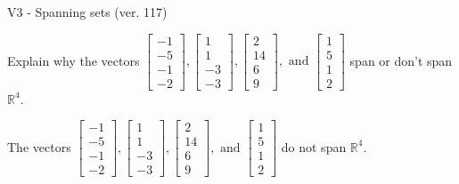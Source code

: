 \begin{exercise}
  \begin{exerciseTitle}V3 - Spanning sets (ver. 117)\end{exerciseTitle}
  \begin{exerciseStatement}
    Explain why the vectors \(\left[\begin{array}{r}
-1 \\
-5 \\
-1 \\
-2
\end{array}\right] , \left[\begin{array}{r}
1 \\
1 \\
-3 \\
-3
\end{array}\right] , \left[\begin{array}{r}
2 \\
14 \\
6 \\
9
\end{array}\right] , \text{ and } \left[\begin{array}{r}
1 \\
5 \\
1 \\
2
\end{array}\right]\) span or don't span \(\mathbb{R}^4\). 
	


  \end{exerciseStatement}
  \begin{exerciseAnswer}
   The vectors \(\left[\begin{array}{r}
-1 \\
-5 \\
-1 \\
-2
\end{array}\right] , \left[\begin{array}{r}
1 \\
1 \\
-3 \\
-3
\end{array}\right] , \left[\begin{array}{r}
2 \\
14 \\
6 \\
9
\end{array}\right] , \text{ and } \left[\begin{array}{r}
1 \\
5 \\
1 \\
2
\end{array}\right]\) 
  	 do not  
	span \(\mathbb{R}^4\).
  


  \end{exerciseAnswer}
\end{exercise}